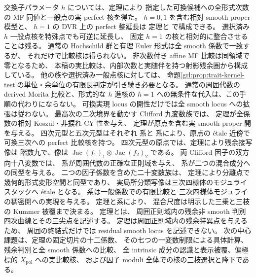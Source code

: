 交換子パラメータ $h$ については、定理により
指定した可換候補への全形式次数の MF 同値と一般点の実 perfect 核を得た。
$h=0,1$ を含む相対 smooth proper 模型と、
$h=1$ の DVR 上の perfect 整延長は
定理と
で構成できる。
選択済み $h$ 一般点核を特殊点でも可逆に延長し、
固定 $h=1$ の核と相対的に整合させることは残る。
通常の Hochschild 群と有理 Euler 形式は全 smooth 係数で一致するが、
それだけで比較核は得られない。
非次数付き affine MF 比較は同領域で零となるため、
本稿の実比較は、内部次数と実随伴を持つ射影残余圏から構成している。
他の族や選択済み一般点核に対しては、
命題\ref{grl:prop:trait-kernel-test}の単位・余単位の有限長判定が引き続き必要となる。
通常の周囲代数の derived Morita 比較と、形式的な $h$ 進核の
$h=1$ への無条件な代入は、この手順の代わりにならない。
可換実現 locus の開性だけでは全 smooth locus への拡張は従わない。
最高次の二次境界を動かす Clifford 九変数族では、
定理が全係数の相対 Koszul・非捩れ CY 性を与え、
定理が原点を含む実 smooth proper 開を与える。
四次元型と五次元型はそれぞれ
系と
系により、原点の \'etale 近傍で
可換三次への perfect 比較核を持つ。
四次元型の原点では、定理により残余接写像は
階数九で、像は $\operatorname{Jac}(f_1)_1\otimes\operatorname{Jac}(f_2)_2$ である。
両 Clifford 因子の双方向十八変数では、
系が周囲代数の正確な正則域を与え、
系が二つの混合成分への同型を与える。
二つの因子係数を含めた二十変数族は、
定理により分離点で幾何的形式変形空間と同型であり、
実局所分類写像は三次四様体のモジュライスタックへ \'etale となる。
系は一般係数での有限比較と
三次四様体モジュライの稠密開への実現を与える。
定理と系により、
混合尺度は明示した三乗と三枝の Kummer 被覆まで決まる。
定理とは、
周囲正則域内の残余非 smooth 判別四次曲線とその三尖点を記述する。
定理は周囲正則域内の残余特異点を与えるため、
周囲の終結式だけでは residual smooth locus を記述できない。
次の中心課題は、定理の固定切片の十二係数、
その七つの一変数制限による具体計算、残余判別と全 smooth 係数への比較、
全 intrinsic 成分の認識と表示被覆、偏極標的 $X_{\mathrm{pol}}$ への実比較核、
および因子 moduli 全体での核の三枝選択と降下である。

